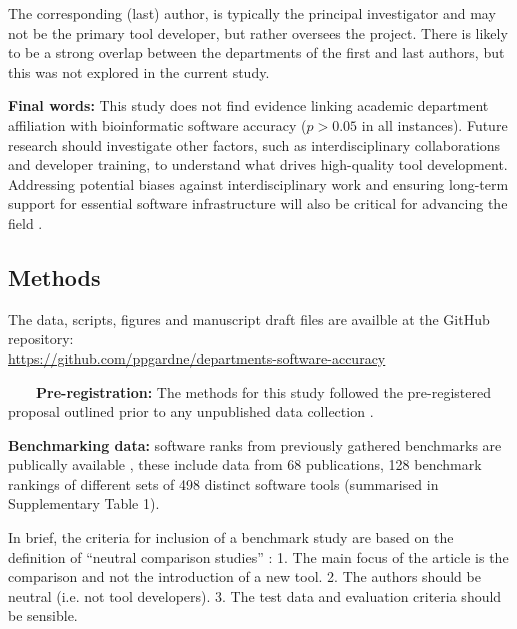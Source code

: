 \documentclass[fleqn,10pt,doc,onecolumn]{SelfArx}%
\begin{document}
The corresponding (last) author, is typically the principal investigator and
may not be the primary tool developer, but rather oversees the
project. There is likely to be a strong overlap between the departments of the first
and last authors, but this was not explored in the current study.

\textbf{Final words:} This study does not find evidence linking
academic department affiliation with bioinformatic software accuracy
($p>0.05$ in all instances). Future research should investigate other
factors, such as interdisciplinary collaborations and developer
training, to understand what drives high-quality tool
development. Addressing potential biases against interdisciplinary
work \cite{bromham2016interdisciplinary} and ensuring long-term
support for essential software infrastructure will also be critical
for advancing the field \cite{siepel2019challenges}.


\subsection*{Methods}

The data, scripts, figures and manuscript draft files are availble at the GitHub repository:\\
\href{https://github.com/ppgardne/departments-software-accuracy}{https://github.com/ppgardne/departments-software-accuracy}


~~~~\textbf{Pre-registration:} The methods for this study followed the pre-registered proposal outlined
prior to any unpublished data collection \cite{gardner2024}.

\textbf{Benchmarking data:} software ranks from previously gathered
benchmarks are publically available \cite{Gardner:2022}, these include data from
68 publications, \textcolor{rv}{128 benchmark rankings of} different sets of 498
distinct software tools (summarised in Supplementary Table 1).

\textcolor{rv}{In brief, the criteria for inclusion of a
  benchmark study are based on the definition of ``neutral comparison
  studies'' \cite{boulesteix2013plea}: 1. The main focus of the
  article is the comparison and not the introduction of a new
  tool. 2. The authors should be neutral (i.e. not tool
  developers). 3. The test data and evaluation criteria should be
  sensible.}


\end{document}
